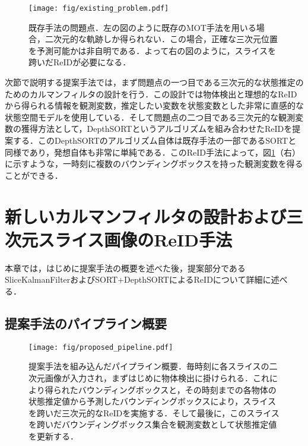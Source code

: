     \begin{figure}[t]
        \centering
        \texttt{[image: fig/existing\_problem.pdf]}
        \caption[既存手法の問題点]{既存手法の問題点．左の図のように既存のMOT手法を用いる場合，二次元的な軌跡しか得られない．この場合，正確な三次元位置を予測可能かは非自明である．よって右の図のように，スライスを跨いだReIDが必要になる．}
        \label{fig:existing_problem}
    \end{figure}

    次節で説明する提案手法では，まず問題点の一つ目である三次元的な状態推定のためのカルマンフィルタの設計を行う．この設計では物体検出と理想的なReIDから得られる情報を観測変数，推定したい変数を状態変数とした非常に直感的な状態空間モデルを使用している．そして問題点の二つ目である三次元的な観測変数の獲得方法として，DepthSORTというアルゴリズムを組み合わせたReIDを提案する．このDepthSORTのアルゴリズム自体は既存手法の一部であるSORTと同様であり，発想自体も非常に単純である．このReID手法によって，図\ref{fig:existing_problem}（右）に示すような，一時刻に複数のバウンディングボックスを持った観測変数を得ることができる．

\section{新しいカルマンフィルタの設計および三次元スライス画像のReID手法}
\label{sec:proposed_method}

本章では，はじめに提案手法の概要を述べた後，提案部分であるSliceKalmanFilterおよびSORT+DepthSORTによるReIDについて詳細に述べる．

    \subsection{提案手法のパイプライン概要}
    \label{subsec:proposed_pipeline}

    \begin{figure}[t]
        \centering
        \texttt{[image: fig/proposed\_pipeline.pdf]}
        \caption[提案手法を組み込んだパイプライン概要]{提案手法を組み込んだパイプライン概要．毎時刻に各スライスの二次元画像が入力され，まずはじめに物体検出に掛けられる．これにより得られたバウンディングボックスと，その時刻までの各物体の状態推定値から予測したバウンディングボックスにより，スライスを跨いだ三次元的なReIDを実施する．そして最後に，このスライスを跨いだバウンディングボックス集合を観測変数として状態推定値を更新する．}
        \label{fig:proposed_pipeline}
    \end{figure}

